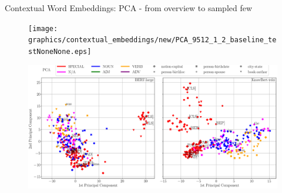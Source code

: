 \begin{frame}{Contextual Word Embeddings: PCA - from overview to sampled few}
    \begin{figure}
        \centering
        \texttt{[image: graphics/contextual\_embeddings/new/PCA\_9512\_1\_2\_baseline\_testNoneNone.eps]}
    \end{figure}
    \begin{figure}
        \centering
        \includegraphics[height=0.78\textheight]{graphics/contextual_embeddings/new/PCA_300_1_2_baseline_test_annotatedNone.eps}
    \end{figure}
\end{frame}

